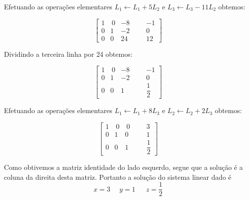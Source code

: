 \begin{solution}
Efetuando as operações elementares $L_1 \leftarrow L_1 + 5L_2$ e $L_3 \leftarrow L_3 - 11L_2$ obtemos:

$$ \left[\begin{array}{rrrr|rr}
	1 & \ 0 &   -8 & & &  -1  \\
	0 &   1 &   -2 & & &   0  \\ 
	0 &   0 &   24 & & &  12  \end{array}\right] $$

Dividindo a terceira linha por 24 obtemos:

$$ \left[\begin{array}{rrrr|rr}
	1 & \ 0 &   -8 & & &  -1            \\[10pt]
	0 &   1 &   -2 & & &   0            \\[10pt] 
	0 &   0 &    1 & & &  \dfrac{1}{2}  \end{array}\right] $$

Efetuando as operações elementares $L_1 \leftarrow L_1 + 8L_3$ e $L_2 \leftarrow L_2 + 2L_3$ obtemos:

$$ \left[\begin{array}{rrrr|rr}
	1 & \ 0 & \  0 & & &   3            \\[10pt]
	0 &   1 &    0 & & &   1            \\[10pt] 
	0 &   0 &    1 & & &  \dfrac{1}{2}  \end{array}\right] $$


Como obtivemos a matriz identidade do lado esquerdo, segue que a solução é a coluna da direita desta matriz. 
Portanto a solução do sistema linear dado é
$$x=3 \ \ \ \ \ \ y=1\ \ \ \ \ \ \ z=\dfrac{1}{2}$$
\end{solution}

